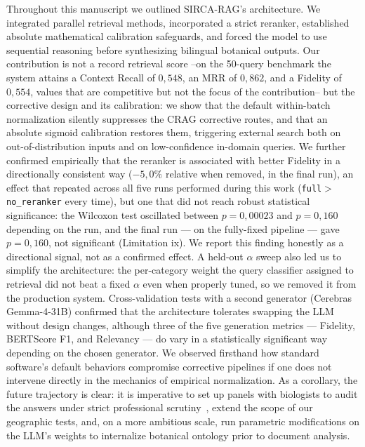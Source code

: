 \documentclass[runningheads]{llncs}
\newcommand{\sirca}{\textsc{SIRCA-RAG}}
\begin{document}
Throughout this manuscript we outlined \sirca{}'s architecture. We integrated parallel retrieval methods, incorporated a strict reranker, established absolute mathematical calibration safeguards, and forced the model to use sequential reasoning before synthesizing bilingual botanical outputs. Our contribution is not a record retrieval score --on the 50-query benchmark the system attains a Context Recall of $0{,}548$, an MRR of $0{,}862$, and a Fidelity of $0{,}554$, values that are competitive but not the focus of the contribution-- but the corrective design and its calibration: we show that the default within-batch normalization silently suppresses the CRAG corrective routes, and that an absolute sigmoid calibration restores them, triggering external search both on out-of-distribution inputs and on low-confidence in-domain queries. We further confirmed empirically that the reranker is associated with better Fidelity in a directionally consistent way ($-5{,}0\%$ relative when removed, in the final run), an effect that repeated across all five runs performed during this work (\texttt{full}${>}$\texttt{no\_reranker} every time), but one that did not reach robust statistical significance: the Wilcoxon test oscillated between $p{=}0{,}00023$ and $p{=}0{,}160$ depending on the run, and the final run — on the fully-fixed pipeline — gave $p{=}0{,}160$, not significant (Limitation ix). We report this finding honestly as a directional signal, not as a confirmed effect. A held-out $\alpha$ sweep also led us to simplify the architecture: the per-category weight the query classifier assigned to retrieval did not beat a fixed $\alpha$ even when properly tuned, so we removed it from the production system. Cross-validation tests with a second generator (Cerebras Gemma-4-31B) confirmed that the architecture tolerates swapping the LLM without design changes, although three of the five generation metrics — Fidelity, BERTScore F1, and Relevancy — do vary in a statistically significant way depending on the chosen generator. We observed firsthand how standard software's default behaviors compromise corrective pipelines if one does not intervene directly in the mechanics of empirical normalization. As a corollary, the future trajectory is clear: it is imperative to set up panels with biologists to audit the answers under strict professional scrutiny~\cite{heinrich2020ethnopharmacology}, extend the scope of our geographic tests, and, on a more ambitious scale, run parametric modifications on the LLM's weights to internalize botanical ontology prior to document analysis.




\end{document}
